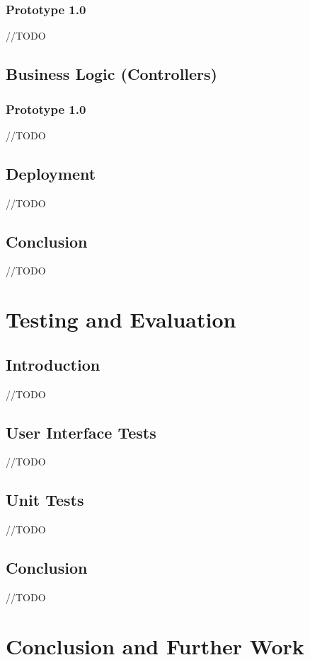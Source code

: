\documentclass[12pt,twoside,a4paper]{report}
\begin{document}
\subsection{Prototype 1.0}\label{4.3.1}
//TODO

\section{Business Logic (Controllers)}\label{4.4}
\subsection{Prototype 1.0}\label{4.4.1}
//TODO

\section{Deployment}\label{4.5}
//TODO

\section{Conclusion}\label{4.3}
//TODO

\chapter{Testing and Evaluation}\label{5}
\section{Introduction}\label{5.1}
//TODO

\section{User Interface Tests}\label{5.3}
//TODO

\section{Unit Tests}\label{5.2}
//TODO

\section{Conclusion}\label{5.4}
//TODO

\chapter{Conclusion and Further Work}\label{6}
\end{document}
